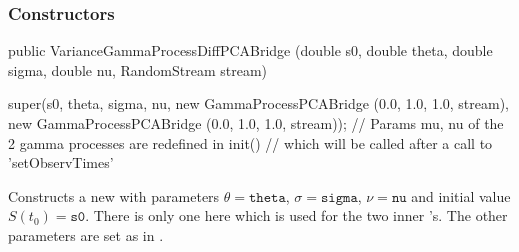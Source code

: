 \subsubsection* {Constructors}
\begin{code}

   public VarianceGammaProcessDiffPCABridge (double s0, double theta,
                                             double sigma, double nu,
                                             RandomStream stream) \begin{hide} {
     super(s0, theta, sigma, nu,
	  new GammaProcessPCABridge (0.0, 1.0, 1.0, stream),
	  new GammaProcessPCABridge (0.0, 1.0, 1.0, stream));
    // Params mu, nu of the 2 gamma processes are redefined in init()
    // which will be called after a call to 'setObservTimes'
}\end{hide}
\end{code}
\begin{tabb}Constructs a new  with
parameters  $\theta = \texttt{theta}$, $\sigma = \texttt{sigma}$, $\nu = \texttt{nu}$
and initial value $S(t_{0}) = \texttt{s0}$.  There is only
one  here which is
used for the two inner 's.  The other
parameters are set as in .
\end{tabb}

\begin{code}\begin{hide}
}
\end{hide}\end{code}
